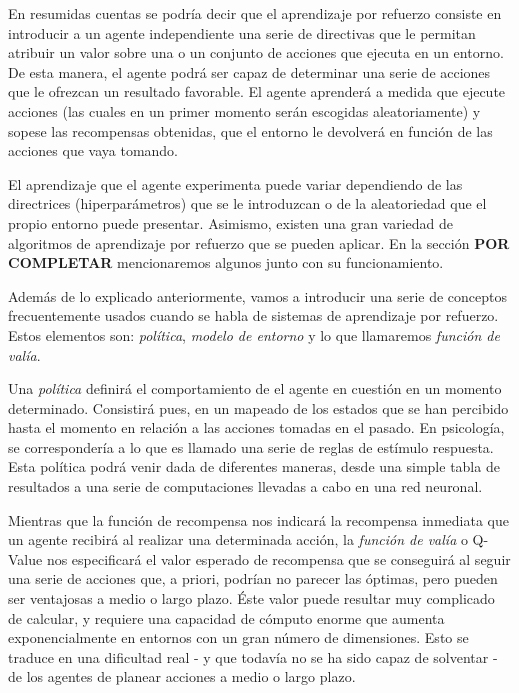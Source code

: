 \documentclass[11pt,spanish,listoffigures,listoftables]{tfgetsinf}
\begin{document}
En resumidas cuentas se podría decir que el aprendizaje por refuerzo consiste en introducir a un agente independiente una serie de directivas que le permitan atribuir un valor sobre una o un conjunto de acciones que ejecuta en un entorno. De esta manera, el agente podrá ser capaz de determinar una serie de acciones que le ofrezcan un resultado favorable. El agente aprenderá a medida que ejecute acciones (las cuales en un primer momento serán escogidas aleatoriamente) y sopese las recompensas obtenidas, que el entorno le devolverá en función de las acciones que vaya tomando.

El aprendizaje que el agente experimenta puede variar dependiendo de las directrices (hiperparámetros) que se le introduzcan o de la aleatoriedad que el propio entorno puede presentar. Asimismo, existen una gran variedad de algoritmos de aprendizaje por refuerzo que se pueden aplicar. En la sección \textbf{POR COMPLETAR} mencionaremos algunos junto con su funcionamiento.


Además de lo explicado anteriormente, vamos a introducir una serie de conceptos frecuentemente usados cuando se habla de sistemas de aprendizaje por refuerzo. Estos elementos son: \textit{política}, \textit{modelo de entorno} y lo que llamaremos \textit{función de valía}.

Una \textit{política} definirá el comportamiento de el agente en cuestión en un momento determinado. Consistirá pues, en un mapeado de los estados que se han percibido hasta el momento en relación a las acciones tomadas en el pasado. En psicología, se correspondería a lo que es llamado una serie de reglas de estímulo respuesta. Esta política podrá venir dada de diferentes maneras, desde una simple tabla de resultados a una serie de computaciones llevadas a cabo en una red neuronal.

Mientras que la función de recompensa nos indicará la recompensa inmediata que un agente recibirá al realizar una determinada acción, la \textit{función de valía} o Q-Value nos especificará el valor esperado de recompensa que se conseguirá al seguir una serie de acciones que, a priori, podrían no parecer las óptimas, pero pueden ser ventajosas a medio o largo plazo. Éste valor puede resultar muy complicado de calcular, y requiere una capacidad de cómputo enorme que aumenta exponencialmente en entornos con un gran número de dimensiones. Esto se traduce en una dificultad real - y que todavía no se ha sido capaz de solventar - de los agentes de planear acciones a medio o largo plazo. 
\end{document}
